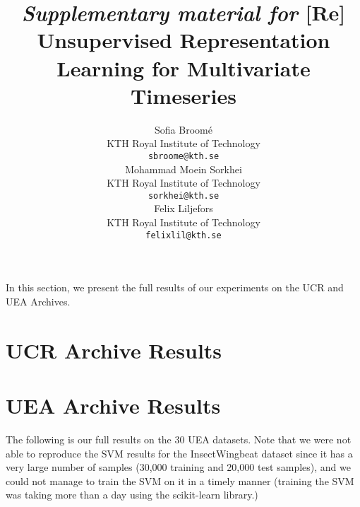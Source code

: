 \documentclass{article}
\title{\textit{Supplementary material for} [Re] Unsupervised Representation Learning for Multivariate Timeseries}
\author{%
  Sofia Broomé \\
  KTH Royal Institute of Technology \\
  \texttt{sbroome@kth.se} \\
  \And
  Mohammad Moein Sorkhei \\
  KTH Royal Institute of Technology \\
  \texttt{sorkhei@kth.se} \\
  \And
  Felix Liljefors \\
  KTH Royal Institute of Technology \\
  \texttt{felixlil@kth.se} \\
}
\begin{document}
\maketitle



In this section, we present the full results of our experiments on the UCR and UEA Archives.

\section{UCR Archive Results}
\drawucrsteps
 


\section{UEA Archive Results}
The following is our full results on the 30 UEA datasets. Note that we were not able to reproduce the SVM results for the InsectWingbeat dataset since it has a very large number of samples (30,000 training and 20,000 test samples), and we could not manage to train the SVM on it in a timely manner (training the SVM was taking more than a day using the scikit-learn library.)

\drawueasteps
\end{document}
